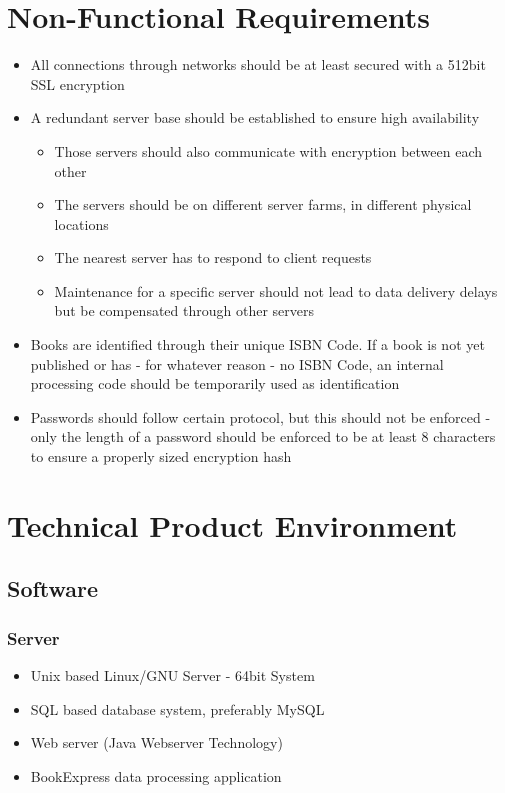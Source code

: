 \documentclass[11pt,a4paper,oneside,svgnames]{report}
\begin{document}
\chapter{Non-Functional Requirements}
\begin{itemize}
	\item All connections through networks should be at least secured with a 512bit SSL encryption
	\item A redundant server base should be established to ensure high availability
		\begin{itemize}
			\item Those servers should also communicate with encryption between each other
			\item The servers should be on different server farms, in different physical locations
			\item The nearest server has to respond to client requests
			\item Maintenance for a specific server should not lead to data delivery delays but be compensated through other servers
		\end{itemize}
	\item Books are identified through their unique ISBN Code. If a book is not yet published or has - for whatever reason - no ISBN Code, an internal processing code should be temporarily used as identification
	\item Passwords should follow certain protocol, but this should not be enforced - only the length of a password should be enforced to be at least 8 characters to ensure a properly sized encryption hash
\end{itemize}

\chapter{Technical Product Environment}
\label{sec:tpe}
\section{Software}
	\subsection{Server}
		\begin{itemize}
			\item Unix based Linux/GNU Server - 64bit System
			\item SQL based database system, preferably MySQL
			\item Web server (Java Webserver Technology)
			\item BookExpress data processing application
		\end{itemize}
\end{document}
